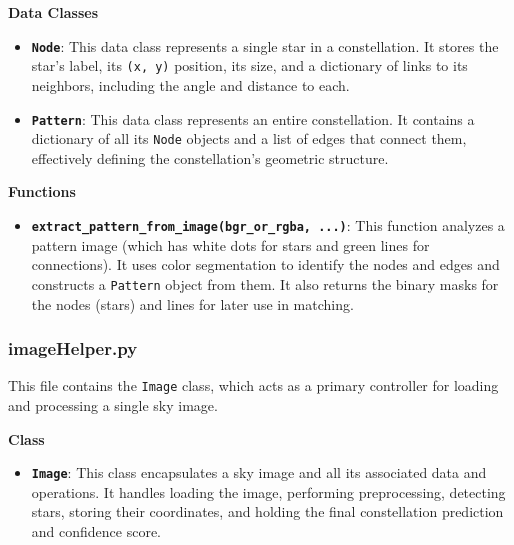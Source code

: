 \documentclass[a4paper,11pt]{article}
\begin{document}
\textbf{Data Classes}
\begin{itemize}
	\item \textbf{\texttt{Node}}: This data class represents a single star in a constellation. It stores the star's label, its \texttt{(x, y)} position, its size, and a dictionary of links to its neighbors, including the angle and distance to each.
	\item \textbf{\texttt{Pattern}}: This data class represents an entire constellation. It contains a dictionary of all its \texttt{Node} objects and a list of edges that connect them, effectively defining the constellation's geometric structure.
\end{itemize}

\textbf{Functions}
\begin{itemize}
	\item \textbf{\texttt{extract\_pattern\_from\_image(bgr\_or\_rgba, ...)}}: This function analyzes a pattern image (which has white dots for stars and green lines for connections). It uses color segmentation to identify the nodes and edges and constructs a \texttt{Pattern} object from them. It also returns the binary masks for the nodes (stars) and lines for later use in matching.
\end{itemize}

\subsubsection*{imageHelper.py}
\hrulefill

This file contains the \texttt{Image} class, which acts as a primary controller for loading and processing a single sky image.

\textbf{Class}
\begin{itemize}
	\item \textbf{\texttt{Image}}: This class encapsulates a sky image and all its associated data and operations. It handles loading the image, performing preprocessing, detecting stars, storing their coordinates, and holding the final constellation prediction and confidence score.
\end{itemize}
\end{document}
